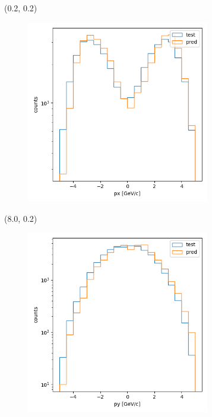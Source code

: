 \documentclass[12pt, xcolor={dvipsnames}, aspectratio = 169]{beamer}
\begin{document}
\begin{frame}

\begin{textblock}{8.0}(0.2, 0.2)
    \begin{figure}
        \centering
        \includegraphics[width=8.0cm]{../imgs/cls-vpx.png}
    \end{figure}
\end{textblock}

\begin{textblock}{8.0}(8.0, 0.2)
    \begin{figure}
        \centering
        \includegraphics[width=8.0cm]{../imgs/cls-vpy.png}
    \end{figure}
\end{textblock}

\end{frame}
\end{document}

